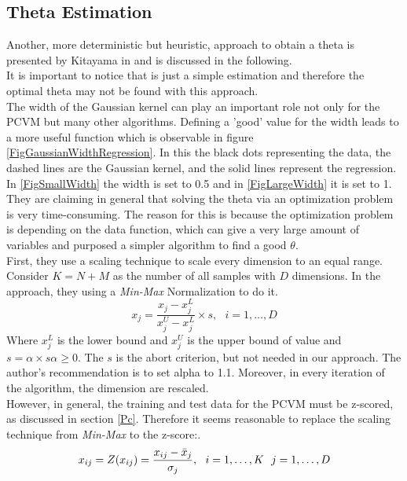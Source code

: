\subsection{Theta Estimation}\label{InSubSecTheta}
Another, more deterministic but heuristic, approach to obtain a theta is presented by Kitayama in \cite{Kitayama.2011} and is discussed in the following.\\
It is important to notice that is just a simple estimation and therefore the optimal theta may not be found with this approach.\\
The width of the Gaussian kernel can play an important role not only for the \acs{PCVM} but many other algorithms.
Defining a 'good' value for the width leads to a more useful function which is observable in figure \ref{FigGaussianWidthRegression}.\cite{Kitayama.2011}
In this the black dots representing the data, the dashed lines are the Gaussian kernel, and the solid lines represent the regression.
In  \ref{FigSmallWidth} the width is set to 0.5 and in \ref{FigLargeWidth} it is set to 1.\newline
They are claiming in general that solving the theta via an optimization problem is very time-consuming.
The reason for this is because the optimization problem is depending on the data function, which can give a very large amount of variables and purposed a simpler algorithm to find a good $\theta$.\cite{Kitayama.2011}\\
First, they use a scaling technique to scale every dimension to an equal range.
Consider $K = N + M$ as the number of all samples with $D$ dimensions.
In the approach, they using a \textit{Min-Max} Normalization to do it.\cite{Kitayama.2011}
\begin{equation}
	x_j = \frac{x_j - x_j^L}{x_j^U-x_j^L} \times s, \>\>\> i=1,\dots,D 
\end{equation}
Where $x_j^L$ is the lower bound and $x_j^U$ is the upper bound of value and $s=\alpha\times s \alpha \ge 0$.
The $s$ is the abort criterion, but not needed in our approach.
The author's recommendation is to set alpha to 1.1.
Moreover, in every iteration of the algorithm, the dimension are rescaled.\\
However, in general, the training and test data for the \acs{PCVM} must be z-scored, as discussed in section \ref{Pc}.
Therefore it seems reasonable to replace the scaling technique from \textit{Min-Max} to the z-score:\cite{Mohamad.2013}.
\begin{equation}\label{EqZTrans}
x_{ij} = Z(x_{ij}) = \frac{x_{ij}-\bar{x}_j}{\sigma_j},\>\>\> i=1,\dots,K \>\>\> j=1,\dots,D
\end{equation}
